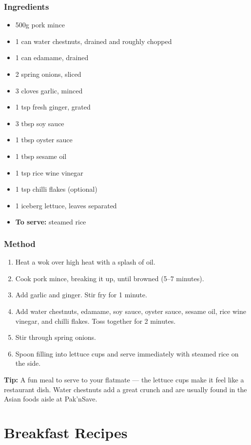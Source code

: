 \documentclass[12pt, a4paper]{book}
\newcommand{\ingredientheader}{\subsection*{\textcolor{accent}{Ingredients}}}
\newcommand{\methodheader}{\subsection*{\textcolor{accent}{Method}}}
\begin{document}
\ingredientheader
\begin{itemize}[leftmargin=1.5em]
  \item 500g pork mince
  \item 1 can water chestnuts, drained and roughly chopped
  \item 1 can edamame, drained
  \item 2 spring onions, sliced
  \item 3 cloves garlic, minced
  \item 1 tsp fresh ginger, grated
  \item 3 tbsp soy sauce
  \item 1 tbsp oyster sauce
  \item 1 tbsp sesame oil
  \item 1 tsp rice wine vinegar
  \item 1 tsp chilli flakes (optional)
  \item 1 iceberg lettuce, leaves separated
  \item \textbf{To serve:} steamed rice
\end{itemize}

\methodheader
\begin{enumerate}[leftmargin=1.5em]
  \item Heat a wok over high heat with a splash of oil.
  \item Cook pork mince, breaking it up, until browned (5--7 minutes).
  \item Add garlic and ginger. Stir fry for 1 minute.
  \item Add water chestnuts, edamame, soy sauce, oyster sauce, sesame oil, rice wine vinegar, and chilli flakes. Toss together for 2 minutes.
  \item Stir through spring onions.
  \item Spoon filling into lettuce cups and serve immediately with steamed rice on the side.
\end{enumerate}

\begin{tipbox}
  \textbf{Tip:} A fun meal to serve to your flatmate --- the lettuce cups make it feel like a restaurant dish. Water chestnuts add a great crunch and are usually found in the Asian foods aisle at Pak'nSave.
\end{tipbox}

\chapter{Breakfast Recipes}
\end{document}
